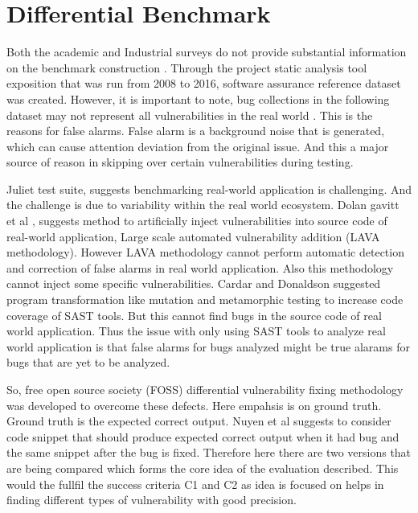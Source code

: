 \documentclass[authoryear,preprint]{sigplanconf}
\begin{document}
\section{Differential Benchmark}
\label{sec:sec_differential_benchmark}
Both the academic and Industrial surveys do not provide substantial information on the benchmark construction\cite{5954458} \cite{5689543} . Through the project static analysis tool exposition that was run from 2008 to 2016, software assurance reference dataset was created. However, it is important to note, bug collections in the following dataset may not represent all vulnerabilities in the real world\cite{greiman2016iccws} \cite{Kupsch2009ManualVA} \cite{Wilander250309}. This is the reasons for false alarms. False alarm is a background noise that is generated, which can cause attention deviation from the original issue. And this a major source of reason in skipping over certain vulnerabilities during testing.

Juliet test suite, suggests benchmarking real-world application is challenging. And the challenge is due to variability within the real world ecosystem. Dolan gavitt et al \cite{7546498}, suggests method to artificially inject vulnerabilities into source code of real-world application, Large scale automated vulnerability addition (LAVA methodology). However LAVA methodology cannot perform automatic detection and correction of false alarms in real world application. Also this methodology cannot inject some specific vulnerabilities. Cardar and Donaldson \cite{Cadar:2016:APA:2889160.2889206} suggested program transformation like mutation and metamorphic testing to increase code coverage of SAST tools. But this cannot find bugs in the source code of  real world application. Thus the issue with only using SAST tools to analyze real world application is that false alarms for bugs analyzed might be true alarams for bugs that are yet to be analyzed.

So, free open source society (FOSS) \cite{Pashchenko:2017:FVD:3106237.3121276} differential vulnerability fixing methodology was developed to overcome these defects. Here empahsis is on ground truth. Ground truth is the expected correct output. Nuyen et al \cite{Do:2016:TAB:2931021.2931023} suggests to consider code snippet that should produce expected correct output when it had bug and the same snippet after the bug is fixed. Therefore here there are two versions that are being compared which forms the core idea of the evaluation described. This would the fullfil the success criteria C1 and C2 as idea is focused on helps in finding different types of vulnerability with good precision.
\end{document}
